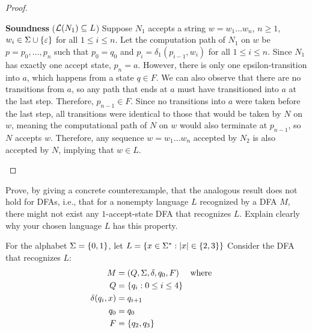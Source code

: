 \begin{problem}
\begin{enumalph}
\begin{Answer}
\begin{claim}
\begin{proof}
\begin{enumroman}
              \item \textbf{Soundness} ($\mathcal{L}(N_1) \subseteq L$)
              Suppose $N_1$ accepts a string $w = w_1\ldots w_n$, $n \ge 1$, $w_i \in \Sigma \cup \left\{\varepsilon\right\}$
              for all $1 \le i \le n$.
              Let the computation path of $N_1$ on $w$ be $p = p_0,\ldots, p_n$
              such that $p_0 = q_0$ and $p_i = \delta_1(p_{i-1}, w_i)$ for all $1 \le i \le n$.
              Since $N_1$ has exactly one accept state, $p_n = a$.
              However, there is only one epsilon-transition into $a$,
              which happens from a state $q \in F$.
              We can also observe that there are no transitions from $a$,
              so any path that ends at $a$ must have transitioned into $a$
              at the last step. Therefore, $p_{n-1} \in F$.
              Since no transitions into $a$ were taken before the last step,
              all transitions were identical to those that would be taken by $N$
              on $w$, meaning the computational path of $N$ on $w$ would also terminate
              at $p_{n-1}$, so $N$ accepts $w$.
              Therefore, any sequence $w = w_1\ldots w_{n}$ accepted by $N_2$
              is also accepted by $N$, implying that $w \in L$.
            \end{enumroman}
          \end{proof}
        \end{claim}
        
      \end{Answer}

    \item Prove, by giving a concrete counterexample,
      that the analogous result does not hold for DFAs,
      i.e., that for a nonempty language $L$ recognized by a DFA $M$,
      there might not exist any $1$-accept-state DFA that recognizes $L$.
      Explain clearly why your chosen language $L$ has this property.
      \begin{Answer}
        For the alphabet $\Sigma = \left\{0, 1\right\}$,
        let $L = \left\{x \in \Sigma^* : \lvert x\rvert \in \left\{2, 3\right\}\right\}$
        Consider the DFA that recognizes $L$:
        \begin{align*}
          M &= (Q, \Sigma, \delta, q_0, F) \quad \text{ where } \quad \\
          Q &= \left\{q_i : 0 \le i \le 4\right\} \\
          \delta(q_i, x) &= q_{i + 1}\\
          q_0 &= q_0 \\
          F &= \left\{q_2, q_3\right\}
        \end{align*}


\end{Answer}
\end{enumalph}
\end{problem}
